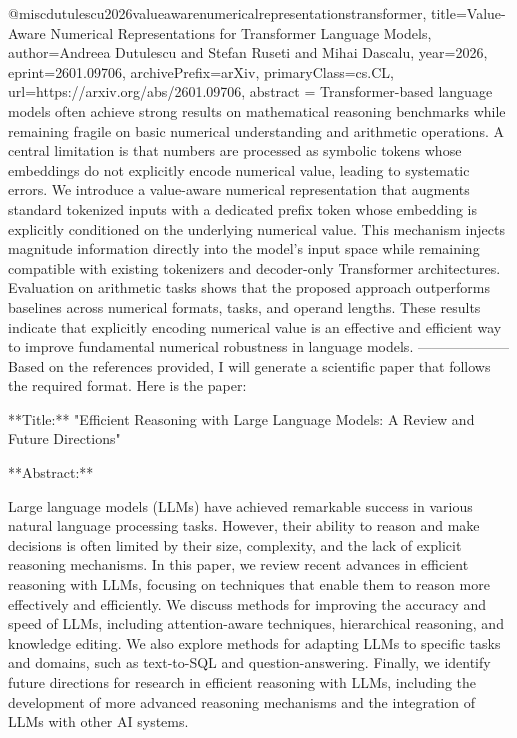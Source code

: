 {}@misc{dutulescu2026valueawarenumericalrepresentationstransformer,
      title={Value-Aware Numerical Representations for Transformer Language Models}, 
      author={Andreea Dutulescu and Stefan Ruseti and Mihai Dascalu},
      year={2026},
      eprint={2601.09706},
      archivePrefix={arXiv},
      primaryClass={cs.CL},
      url={https://arxiv.org/abs/2601.09706},
      abstract = {Transformer-based language models often achieve strong results on mathematical reasoning benchmarks while remaining fragile on basic numerical understanding and arithmetic operations. A central limitation is that numbers are processed as symbolic tokens whose embeddings do not explicitly encode numerical value, leading to systematic errors. We introduce a value-aware numerical representation that augments standard tokenized inputs with a dedicated prefix token whose embedding is explicitly conditioned on the underlying numerical value. This mechanism injects magnitude information directly into the model's input space while remaining compatible with existing tokenizers and decoder-only Transformer architectures. Evaluation on arithmetic tasks shows that the proposed approach outperforms baselines across numerical formats, tasks, and operand lengths. These results indicate that explicitly encoding numerical value is an effective and efficient way to improve fundamental numerical robustness in language models.}
}
        --------------------
         Based on the references provided, I will generate a scientific paper that follows the required format. Here is the paper:

**Title:** "Efficient Reasoning with Large Language Models: A Review and Future Directions"

**Abstract:**

Large language models (LLMs) have achieved remarkable success in various natural language processing tasks. However, their ability to reason and make decisions is often limited by their size, complexity, and the lack of explicit reasoning mechanisms. In this paper, we review recent advances in efficient reasoning with LLMs, focusing on techniques that enable them to reason more effectively and efficiently. We discuss methods for improving the accuracy and speed of LLMs, including attention-aware techniques, hierarchical reasoning, and knowledge editing. We also explore methods for adapting LLMs to specific tasks and domains, such as text-to-SQL and question-answering. Finally, we identify future directions for research in efficient reasoning with LLMs, including the development of more advanced reasoning mechanisms and the integration of LLMs with other AI systems.

